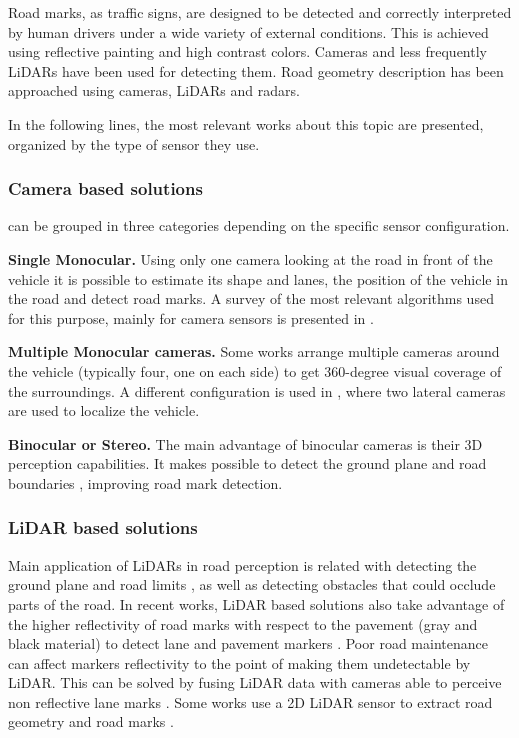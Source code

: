 \documentclass[journal]{IEEEtran}
\begin{document}
Road marks, as traffic signs, are designed to be detected and 
correctly interpreted by human drivers under a wide variety of external 
conditions. This is achieved using reflective painting and high contrast 
colors. Cameras and less frequently LiDARs have been used for detecting them.
Road geometry description has been approached using cameras, LiDARs and radars.

In the following lines, the most relevant works about this topic are presented, 
organized by the type of sensor they use.


\subsubsection{Camera based solutions}
can be grouped in three categories depending on the specific sensor 
configuration.

\textbf{Single Monocular.}
Using only one 
camera looking at the road in front of the vehicle it is possible to estimate 
its shape and lanes, the position of the vehicle in the road and  
detect road marks. A survey of the most 
relevant algorithms used for this purpose, mainly for camera sensors is 
presented in \cite{hillel2014recent}.

\textbf{Multiple Monocular cameras.} 
Some works \cite{lee2017avm, kum2013lane} arrange multiple cameras 
around the vehicle (typically four, one on each side) to get 360-degree 
visual coverage of the surroundings. 
A different configuration is used in \cite{Ieng2003}, where two lateral cameras
are used to localize the vehicle. 

\textbf{Binocular or Stereo.} 
The main advantage of binocular cameras is their 3D perception capabilities.
It makes possible to detect the ground plane and road boundaries 
\cite{schreiber2013laneloc, ozgunalp2017multiple}, improving road mark 
detection. 

\subsubsection{LiDAR based solutions}
Main application of LiDARs in road perception is related with detecting the 
ground plane and road limits \cite{pengpeng20193d}, as well as detecting obstacles that could occlude 
parts of the road.
In recent works, LiDAR based solutions also take advantage of the higher 
reflectivity of road marks with respect to the pavement (gray and black 
material) to detect lane \cite{yang2012automated, li2013new} and
pavement markers \cite{Zhang2016}.
Poor road maintenance can affect markers reflectivity to the point of making 
them undetectable by LiDAR. This can be solved by fusing LiDAR 
data with cameras able to perceive non reflective lane marks \cite{lee2017avm}.
Some works use a 2D LiDAR sensor to extract road geometry and road marks 
\cite{nie2012camera, kim2015lane}.
\end{document}
